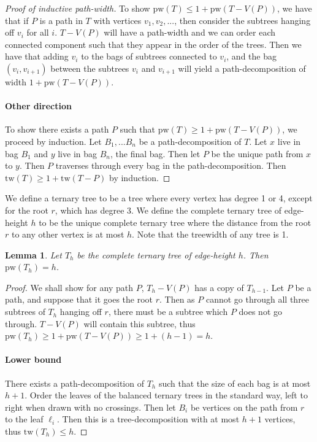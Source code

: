 \documentclass[]{article}
\newcommand{\tw}{\text{tw}}
\newcommand{\pw}{\text{pw}}
\newtheorem{lemma}[theorem]{Lemma}
\theoremstyle{definition}
\numberwithin{theorem}{section}
\numberwithin{equation}{section}
\begin{document}
\begin{proof}[Proof of inductive path-width]
	To show $\pw(T) \leq 1 + \pw(T - V(P))$, we have that if $P$ is a path in $T$ with vertices $v_1, v_2, ...$, then consider the subtrees hanging off $v_i$ for all $i$. $T - V(P)$ will have a path-width and we can order each connected component such that they appear in the order of the trees. Then we have that adding $v_i$ to the bags of subtrees connected to $v_i$, and the bag $(v_i, v_{i+1})$ between the subtrees $v_i$ and $v_{i + 1}$ will yield a path-decomposition of width $1 + \pw(T - V(P))$. 
	\paragraph{Other direction}
	To show there exists a path $P$ such that $\pw(T) \geq 1 + \pw(T - V(P))$, we proceed by induction. Let $B_1, ... B_n$ be a path-decomposition of $T$. Let $x$ live in bag $B_1$ and $y$ live in bag $B_n$, the final bag. Then let $P$ be the unique path from $x$ to $y$. Then $P$ traverses through every bag in the path-decomposition. Then $\tw(T) \geq 1 + \tw(T - P)$ by induction. 
\end{proof}

We define a ternary tree to be a tree where every vertex has degree 1 or 4, except for the root $r$, which has degree 3. We define the complete ternary tree of edge-height $h$ to be the unique complete ternary tree where the distance from the root $r$ to any other vertex is at most $h$. Note that the treewidth of any tree is 1.
\begin{lemma}
	Let $T_h$ be the complete ternary tree of edge-height $h$. Then $\pw(T_h) = h$.
\end{lemma}

\begin{proof}
	We shall show for any path $P$, $T_h - V(P)$ has a copy of $T_{h-1}$. Let $P$ be a path, and suppose that it goes the root $r$. Then as $P$ cannot go through all three subtrees of $T_h$ hanging off $r$, there must be a subtree which $P$ does not go through. $T - V(P)$ will contain this subtree, thus $\pw(T_h) \geq 1 + \pw(T - V(P)) \geq 1 + (h-1) = h$.
	\paragraph{Lower bound}
	There exists a path-decomposition of $T_h$ such that the size of each bag is at most $h + 1$. Order the leaves of the balanced ternary trees in the standard way, left to right when drawn with no crossings. Then let $B_i$ be vertices on the path from $r$ to the leaf $\ell_i$. Then this is a tree-decomposition with at most $h + 1$ vertices, thus $\tw(T_h) \leq h$.
\end{proof}
\end{document}
